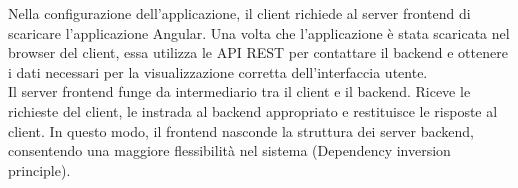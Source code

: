 Nella configurazione dell'applicazione, il client richiede al server frontend di scaricare l'applicazione Angular. Una volta che l'applicazione è stata scaricata nel browser del client, essa utilizza le API REST per contattare il backend e ottenere i dati necessari per la visualizzazione corretta dell'interfaccia utente.\\

Il server frontend funge da intermediario tra il client e il backend. Riceve le richieste del client, le instrada al backend appropriato e restituisce le risposte al client. In questo modo, il frontend nasconde la struttura dei server backend, consentendo una maggiore flessibilità nel sistema (Dependency inversion principle).\